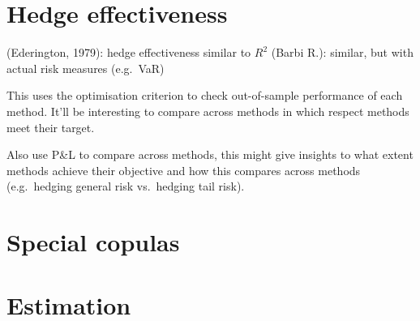 \documentclass[square]{article} %
\theoremstyle{plain}
\theoremstyle{definition} %
\begin{document}
\section{Hedge effectiveness}
\label{sec:hedge-effectiveness}

(Ederington, 1979): hedge effectiveness similar to $R^2$
(Barbi R.): similar, but with actual risk measures (e.g.\ VaR)

This uses the optimisation criterion to check out-of-sample
performance of each method. It'll be interesting to compare across
methods in which respect methods meet their target.

Also use P\&L to compare across methods, this might give insights to
what extent methods achieve their objective and how this compares
across methods (e.g.\ hedging general risk vs.\ hedging tail risk). 

%


\section{Special copulas}
\label{sec:dependence}


\newpage
\section{Estimation}



\newpage
\end{document}
